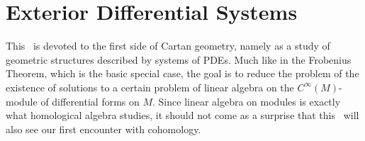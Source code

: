 







\clearpage
\chapter{Exterior Differential Systems}\label{chap: EDSs}


This \chap\ is devoted to the first side of Cartan geometry, namely as a study of geometric structures described by systems of PDEs.
Much like in the Frobenius Theorem, which is the basic special case, the goal is to reduce the problem of the existence of solutions to a certain problem of linear algebra on the $C^\infty(M)$-module of differential forms on $M$. Since linear algebra on modules is exactly what homological algebra studies, it should not come as a surprise that this \chap\ will also see our first encounter with cohomology.

